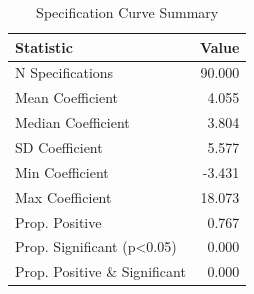 \begin{table}[!h]
\centering
\caption{\label{tab:tab:spec_curve}Specification Curve Summary}
\centering
\begin{tabular}[t]{lr}
\toprule
Statistic & Value\\
\midrule
N Specifications & 90.000\\
Mean Coefficient & 4.055\\
Median Coefficient & 3.804\\
SD Coefficient & 5.577\\
Min Coefficient & -3.431\\
\addlinespace
Max Coefficient & 18.073\\
Prop. Positive & 0.767\\
Prop. Significant (p<0.05) & 0.000\\
Prop. Positive \& Significant & 0.000\\
\bottomrule
\end{tabular}
\end{table}
